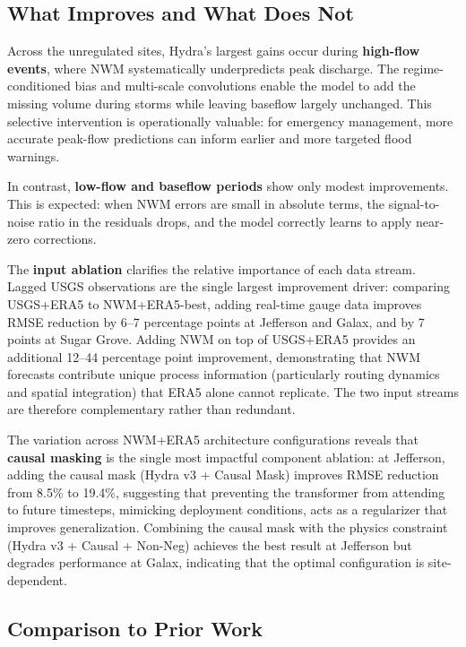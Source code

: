 \documentclass[draft]{agujournal2019}
\begin{document}
\subsection{What Improves and What Does Not}

Across the unregulated sites, Hydra's largest gains occur during \textbf{high-flow events}, where NWM systematically underpredicts peak discharge. The regime-conditioned bias and multi-scale convolutions enable the model to add the missing volume during storms while leaving baseflow largely unchanged. This selective intervention is operationally valuable: for emergency management, more accurate peak-flow predictions can inform earlier and more targeted flood warnings.

In contrast, \textbf{low-flow and baseflow periods} show only modest improvements. This is expected: when NWM errors are small in absolute terms, the signal-to-noise ratio in the residuals drops, and the model correctly learns to apply near-zero corrections.

The \textbf{input ablation} clarifies the relative importance of each data stream. Lagged USGS observations are the single largest improvement driver: comparing USGS+ERA5 to NWM+ERA5-best, adding real-time gauge data improves RMSE reduction by 6--7 percentage points at Jefferson and Galax, and by 7 points at Sugar Grove. Adding NWM on top of USGS+ERA5 provides an additional 12--44 percentage point improvement, demonstrating that NWM forecasts contribute unique process information (particularly routing dynamics and spatial integration) that ERA5 alone cannot replicate. The two input streams are therefore complementary rather than redundant.

The variation across NWM+ERA5 architecture configurations reveals that \textbf{causal masking} is the single most impactful component ablation: at Jefferson, adding the causal mask (Hydra v3 + Causal Mask) improves RMSE reduction from 8.5\% to 19.4\%, suggesting that preventing the transformer from attending to future timesteps, mimicking deployment conditions, acts as a regularizer that improves generalization. Combining the causal mask with the physics constraint (Hydra v3 + Causal + Non-Neg) achieves the best result at Jefferson but degrades performance at Galax, indicating that the optimal configuration is site-dependent.

\subsection{Comparison to Prior Work}
\end{document}
